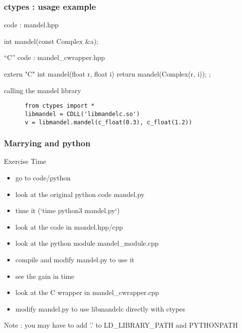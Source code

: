 \begin{frame}[fragile]
  \frametitle{ctypes : usage example}
  \begin{block}{\cpp code : mandel.hpp}
    \begin{cppcode*}{}
      int mandel(const Complex &a);
    \end{cppcode*}
  \end{block}
  \begin{block}{``C'' code : mandel\_cwrapper.hpp}
    \begin{cppcode*}{}
      extern "C" {
        int mandel(float r, float i) {
          return mandel(Complex(r, i));
        };
      }
    \end{cppcode*}
  \end{block}
  \begin{exampleblock}{calling the mandel library}
    \begin{verbatim}
      from ctypes import *
      libmandel = CDLL('libmandelc.so')
      v = libmandel.mandel(c_float(0.3), c_float(1.2))
    \end{verbatim}
  \end{exampleblock}
\end{frame}

\begin{frame}[fragile]
  \frametitle{Marrying \cpp and python}
  \begin{alertblock}{Exercise Time}
    \begin{itemize}
    \item go to code/python
    \item look at the original python code mandel.py
    \item time it (`time python3 mandel.py`)
    \item look at the code in mandel.hpp/cpp
    \item look at the python module mandel\_module.cpp
    \item compile and modify mandel.py to use it
    \item see the gain in time
    \item look at the C wrapper in mandel\_cwrapper.cpp
    \item modify mandel.py to use libmandelc directly with ctypes
    \end{itemize}
  \end{alertblock}
  \tiny Note : you may have to add '.' to LD\_LIBRARY\_PATH and PYTHONPATH
\end{frame}
